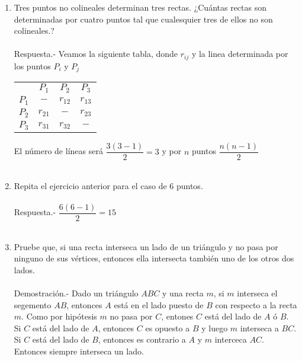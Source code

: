 \documentclass[10pt]{article}
\begin{document}
\begin{enumerate}
    \item Tres puntos no colineales determinan tres rectas. ¿Cuántas rectas son determinadas por cuatro puntos tal que cualesquier tres de ellos no son colineales.?\\\\
    Respuesta.-\; Veamos la siguiente tabla, donde $r_{ij}$ y la linea determinada por los puntos $P_i$ y $P_j$
    \begin{center}
	\begin{tabular}{cccc}
	    &$P_1$&$P_2$&$P_3$\\
	    $P_1$&$-$&$r_{12}$&$r_{13}$\\
	    $P_2$&$r_{21}$&$-$&$r_{23}$\\
	    $P_3$&$r_{31}$&$r_{32}$&$-$\\
	\end{tabular}
    \end{center}
    El número de líneas será $\dfrac{3(3-1)}{2}=3$ y por $n$ puntos $\dfrac{n(n-1)}{2}$\\\\

    \item Repita el ejercicio anterior para el caso de $6$ puntos.\\\\
    Respuesta.-\; $\dfrac{6(6-1)}{2}=15$\\\\

    \item Pruebe que, si una recta interseca un lado de un triángulo y no pasa por ninguno de sus vértices, entonces ella intersecta también uno de los otros dos lados.\\\\
    Demostración.-\; Dado un triángulo $ABC$ y una recta $m$, si $m$ interseca el segemento $AB$, entonces $A$ está en el lado puesto de $B$ con respecto a la recta $m$. Como por hipótesis $m$ no pasa por $C$, entones $C$ está del lado de $A$ ó $B$.\\
    Si $C$ está del lado de $A$, entonces $C$ es opuesto a $B$ y luego $m$ interseca a $BC$.\\
    Si $C$ está del lado de $B$, entonces es contrario a $A$ y $m$ interceca $AC$.\\
    Entonces siempre interseca un lado.\\\\


\end{enumerate}
\end{document}
